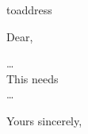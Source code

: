 \documentclass[]{stvhoey-letter}  %
\begin{document}
       
\begin{letter}{toaddress}

\opening{Dear,}

\ldots \\
This needs \\
\ldots
 
 \closing{Yours sincerely,} 

 \end{letter} 
 \printenotes
 
\end{document}
